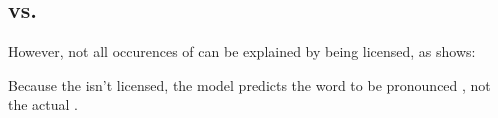 \subsection{\textipa{[N]} vs. \textipa{[Ng]}}

\TODO{}

\begin{structure}{ \ti{[pINpON]}}
  \wordstart
  \Ng[nolic]
  \emptyV[gov]
  \Ng[nolic]
  \fen
\end{structure}

However, not all occurences of \textipa{[Ng]} can be explained
by \textipa{[g]} being licensed, as  shows:
\begin{structure}{ \ti{*[aNlIstIk]}}
  \wordstart
  \Ng[nolic]
  \emptyV[gov]
  \emptyV[gov]
  \fen
\end{structure}
Because the \textipa{[g]} isn't licensed, the model predicts
the word to be pronounced , not the
actual .
